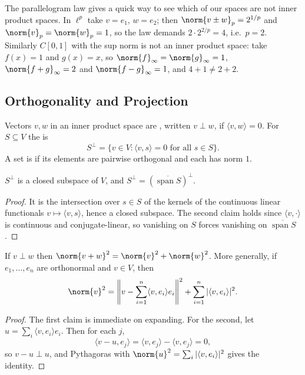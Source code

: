 \documentclass[a4paper]{scrartcl}
\newcommand{\ip}[2]{\langle #1, #2 \rangle}
\newcommand{\spn}{\operatorname{span}}
\begin{document}
\begin{example}
	The parallelogram law gives a quick way to see which of our spaces are not inner product spaces. In $\ell^p$ take $v = e_1$, $w = e_2$; then $\norm{v \pm w}_p = 2^{1/p}$ and $\norm{v}_p = \norm{w}_p = 1$, so the law demands $2 \cdot 2^{2/p} = 4$, i.e.\ $p = 2$. Similarly $C[0,1]$ with the sup norm is not an inner product space: take $f(x) = 1$ and $g(x)=x$, so $\norm{f}_\infty = \norm{g}_\infty = 1$, $\norm{f+g}_\infty=2$ and $\norm{f-g}_\infty = 1$, and $4 + 1 \neq 2 + 2$.
\end{example}

\subsection{Orthogonality and Projection}

\begin{definition}[Orthogonality]
	Vectors $v,w$ in an inner product space are , written $v \perp w$, if $\ip{v}{w}=0$. For $S \subseteq V$ the  is
	$$S^\perp = \{ v \in V : \ip{v}{s}=0 \text{ for all } s \in S \}.$$
	A set is  if its elements are pairwise orthogonal and each has norm $1$.
\end{definition}

\begin{proposition}
	$S^\perp$ is a closed subspace of $V$, and $S^\perp = (\overline{\spn S})^\perp$.
\end{proposition}

\begin{proof}
	It is the intersection over $s \in S$ of the kernels of the continuous linear functionals $v \mapsto \ip{v}{s}$, hence a closed subspace. The second claim holds since $\ip{v}{\cdot}$ is continuous and conjugate-linear, so vanishing on $S$ forces vanishing on $\overline{\spn S}$.
\end{proof}

\begin{proposition}[Pythagoras]
	If $v \perp w$ then $\norm{v+w}^2 = \norm{v}^2+\norm{w}^2$. More generally, if $e_1,\dots,e_n$ are orthonormal and $v \in V$, then
	$$\norm{v}^2 = \left\| v - \sum_{i=1}^n \ip{v}{e_i}e_i \right\|^2 + \sum_{i=1}^n |\ip{v}{e_i}|^2.$$
\end{proposition}

\begin{proof}
	The first claim is immediate on expanding. For the second, let $u = \sum_i \ip{v}{e_i}e_i$. Then for each $j$,
	$$\ip{v - u}{e_j} = \ip{v}{e_j} - \ip{v}{e_j} = 0,$$
	so $v - u \perp u$, and Pythagoras with $\norm{u}^2 = \sum_i |\ip{v}{e_i}|^2$ gives the identity.
\end{proof}
\end{document}
